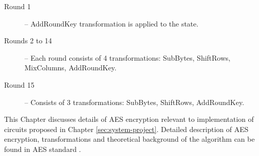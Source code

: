 \begin{description}
\item[Round 1] -- AddRoundKey transformation is applied to the state.
\item[Rounds 2 to 14] -- Each round consists of 4 transformations: SubBytes, ShiftRows, MixColumns, AddRoundKey.
\item[Round 15] -- Consists of 3 transformations: SubBytes, ShiftRows, AddRoundKey.
\end{description}

This Chapter discusses details of AES encryption relevant to implementation of circuits proposed in Chapter \ref{sec:system-project}. Detailed description of AES encryption, transformations and theoretical background of the algorithm can be found in AES standard \cite{aes-standard}.







